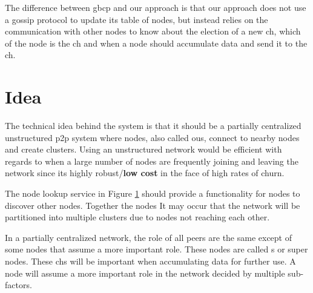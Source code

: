 \documentclass[USenglish]{uit-thesis}
\begin{document}
The difference between \gls{gbcp} and our approach is that our approach does not use a gossip protocol to update its table of nodes, but instead relies on the communication with other nodes to know about the election of a new \gls{ch}, which of the node is the \gls{ch} and when a node should accumulate data and send it to the \gls{ch}.


\chapter{Idea} \label{chap:idea}





The technical idea behind the system is that it should be a partially centralized unstructured \gls{p2p} system where nodes, also called \gls{ou}s, connect to nearby nodes and create clusters. Using an unstructured network would be efficient with regards to  when a large number of nodes are frequently joining and leaving the network since its highly robust/\textbf{low cost} in the face of high rates of churn.

The node lookup service in Figure \ref{chap:idea} should provide a functionality for nodes to discover other nodes. Together the nodes It may occur that the network will be partitioned into multiple clusters due to nodes not reaching each other.


In a partially centralized network, the role of all peers are the same except of some nodes that assume a more important role. These nodes are called s or super nodes. These \gls{ch}s will be important when accumulating data for further use. A node will assume a more important role in the network decided by multiple sub-factors. 
\end{document}
